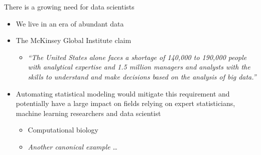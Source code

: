 \begin{frame}{There is a growing need for data scientists}
  \begin{itemize}
    \item We live in an era of abundant data
    \vspace{\baselineskip}
    \item The McKinsey Global Institute claim
    \begin{itemize}
      \item \emph{``The United States alone faces a shortage of 140,000 to 190,000 people with analytical expertise and 1.5 million managers and analysts with the skills to understand and make decisions based on the analysis of big data.''}
    \end{itemize}
    \vspace{\baselineskip}
    \item Automating statistical modeling would mitigate this requirement and potentially have a large impact on fields relying on expert statisticians, machine learning researchers and data scientist
    \begin{itemize}
       \item \eg Computational biology
       \item \emph{Another canonical example} \ldots
     \end{itemize}
  \end{itemize}
\end{frame}

